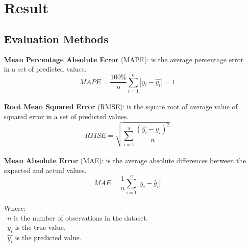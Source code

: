 \documentclass{ieeeojies}
\begin{document}
\section{Result}
\subsection{Evaluation Methods}
\textbf{Mean Percentage Absolute Error} (MAPE): is the average percentage error in a set of predicted values.\\
\[MAPE=\frac{100\%}{n}  \sum_{i=1}^{n} |y_i-\hat{y_i} |  = 1 \]\\
\textbf{Root Mean Squared Error} (RMSE): is the square root of average value of squared error in a set of predicted values.\\
\[RMSE=\sqrt{\sum_{i=1}^{n} \frac{(\hat{y_i}-y_i )^2}{n} }\]\\
\textbf{Mean Absolute Error} (MAE): is the average absolute differences between the expected and actual values.\\
\[MAE= \frac{1}{n}\sum_{i=1}^{n}|y_i - \hat{g}_i| \]\\
Where: \\
	\indent\textbullet\ \(n\) is the number of observations in the dataset.\\
	\indent\textbullet\ \(y_i\)  is the true value.\\
	\indent\textbullet\ \(\hat{y_i}\) is the predicted value.
\end{document}
